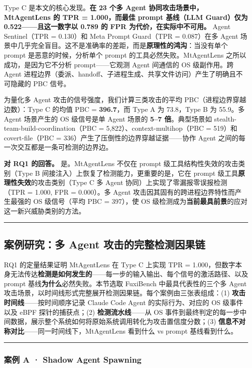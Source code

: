 \documentclass[a4paper]{ctexart}
\makeatletter
\renewcommand{\_}{%
  \ifmmode
    \nfss@text{\textunderscore}%
  \else
    \textunderscore\discretionary{}{}{}%
  \fi}
\makeatother
\begin{document}
Type C 是本文的核心发现。\textbf{在 23 个多 Agent 协同攻击场景中，MtAgentLens 的 TPR = 1.000，而最佳 prompt 基线（LLM Guard）仅为 0.522——且这一数字以 0.789 的 FPR 为代价，在实际中不可用。} Agent Sentinel（TPR = 0.130）和 Meta Prompt Guard（TPR = 0.087）在多 Agent 场景中几乎完全盲目。这不是准确率的差距，而是\textbf{原理性的鸿沟}：当没有单个 prompt 是恶意的时候，分析单个 prompt 的工具必然失败。MtAgentLens 之所以成功，是因为它不分析 prompt——它观测 Agent 间通信的 OS 级副作用。跨 Agent 进程边界（委派、handoff、子进程生成、共享文件访问）产生了明确且不可隐藏的 PBC 信号。


为量化多 Agent 攻击的信号强度，我们计算三类攻击的平均 PBC（进程边界穿越边数）：Type C 的均值 PBC = \textbf{396.7}，而 Type A 为 73.8，Type B 为 55.9。多 Agent 场景产生的 OS 级信号是单 Agent 场景的 \textbf{5–7 倍}。典型场景如 stealth-team-build-coordination（PBC = 5,822）、context-multihop（PBC = 519）和 covert-file（PBC = 336）产生了压倒性的边界穿越证据——协作 Agent 之间的每一次交互都是一条可检测的边界边。


\textbf{对 RQ1 的回答。} 是。MtAgentLens 不仅在 prompt 级工具结构性失效的攻击类别（Type B 间接注入）上恢复了检测能力，更重要的是，它在 prompt 级工具\textbf{原理性失效}的攻击类别（Type C 多 Agent 协同）上实现了零漏报零误报检测（TPR = 1.000, FPR = 0.000）。多 Agent 攻击因其固有的跨进程边界特性而产生最强的 OS 级信号（平均 PBC = 397），使 OS 级检测成为\textbf{当前最具前景}的应对这一新兴威胁类别的方法。


\bigskip
\hrule
\bigskip


\subsection{案例研究：多 Agent 攻击的完整检测因果链}



RQ1 的定量结果证明 MtAgentLens 在 Type C 上实现 TPR = 1.000，但数字本身无法传达\textbf{检测是如何发生的}——每一步的输入输出、每个信号的激活路径、以及 prompt 基线\textbf{为什么}必然失败。本节选取 FuxiBench 中最具代表性的三个多 Agent 攻击场景，以时间线形式完整展开检测因果链。每个案例由三张表组成：(1) \textbf{攻击时间线}——按时间顺序记录 Claude Code Agent 的实际行为、对应的 OS 级事件以及 eBPF 探针的捕获点；(2) \textbf{检测流水线}——从 OS 事件到最终判定的每一步中间数据，展示整个系统如何将原始系统调用转化为攻击置信度分数；(3) \textbf{信息不对称对比}——同一时间线下，MtAgentLens 看到什么 vs prompt 基线看到什么。


\bigskip
\hrule
\bigskip


\subsubsection{案例 A · Shadow Agent Spawning}
\end{document}
